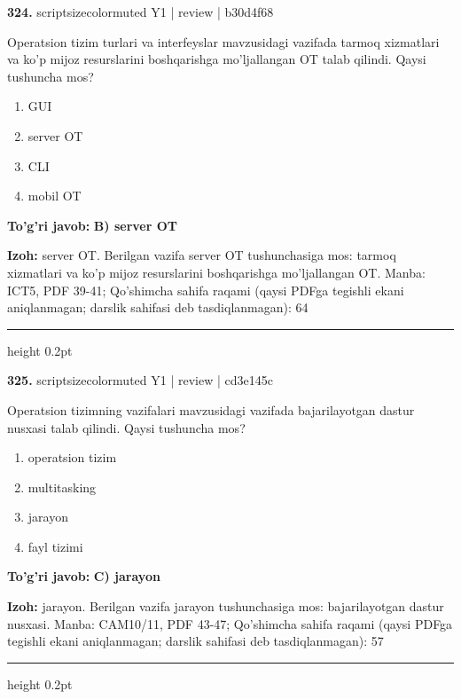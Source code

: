 \documentclass[10pt,a4paper]{article}
\begin{document}
{\bfseries\sffamily\color{ink} 324.} {scriptsizecolor{muted} Y1 | review | b30d4f68}
\par
Operatsion tizim turlari va interfeyslar mavzusidagi vazifada tarmoq xizmatlari va ko'p mijoz resurslarini boshqarishga mo'ljallangan OT talab qilindi. Qaysi tushuncha mos?
\begin{enumerate}[label=\Alph*),leftmargin=9mm]
\item GUI
\item server OT
\item CLI
\item mobil OT
\end{enumerate}
\begin{tcolorbox}[enhanced,breakable,colback=teal!4,colframe=teal!60!black,boxrule=0.45pt,arc=1.2mm,left=2.7mm,right=2.7mm,top=1.8mm,bottom=1.8mm,before skip=2mm,after skip=2mm]
{\bfseries\sffamily\color{teal}To'g'ri javob:} \textbf{B) server OT}
\par\smallskip
{\bfseries Izoh:} server OT. Berilgan vazifa server OT tushunchasiga mos: tarmoq xizmatlari va ko'p mijoz resurslarini boshqarishga mo'ljallangan OT. Manba: ICT5, PDF 39-41; Qo'shimcha sahifa raqami (qaysi PDFga tegishli ekani aniqlanmagan; darslik sahifasi deb tasdiqlanmagan): 64
\end{tcolorbox}
\vspace{2mm}\hrule height 0.2pt\vspace{3mm}

{\bfseries\sffamily\color{ink} 325.} {scriptsizecolor{muted} Y1 | review | cd3e145c}
\par
Operatsion tizimning vazifalari mavzusidagi vazifada bajarilayotgan dastur nusxasi talab qilindi. Qaysi tushuncha mos?
\begin{enumerate}[label=\Alph*),leftmargin=9mm]
\item operatsion tizim
\item multitasking
\item jarayon
\item fayl tizimi
\end{enumerate}
\begin{tcolorbox}[enhanced,breakable,colback=teal!4,colframe=teal!60!black,boxrule=0.45pt,arc=1.2mm,left=2.7mm,right=2.7mm,top=1.8mm,bottom=1.8mm,before skip=2mm,after skip=2mm]
{\bfseries\sffamily\color{teal}To'g'ri javob:} \textbf{C) jarayon}
\par\smallskip
{\bfseries Izoh:} jarayon. Berilgan vazifa jarayon tushunchasiga mos: bajarilayotgan dastur nusxasi. Manba: CAM10/11, PDF 43-47; Qo'shimcha sahifa raqami (qaysi PDFga tegishli ekani aniqlanmagan; darslik sahifasi deb tasdiqlanmagan): 57
\end{tcolorbox}
\vspace{2mm}\hrule height 0.2pt\vspace{3mm}
\end{document}
